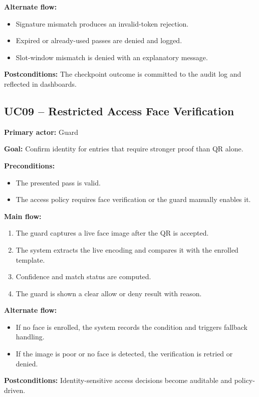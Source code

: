 \documentclass[12pt,letterpaper]{article}
\begin{document}
\textbf{Alternate flow:}
\begin{itemize}
    \item Signature mismatch produces an invalid-token rejection.
    \item Expired or already-used passes are denied and logged.
    \item Slot-window mismatch is denied with an explanatory message.
\end{itemize}

\textbf{Postconditions:} The checkpoint outcome is committed to the audit log and reflected in dashboards.

\subsection{UC09 -- Restricted Access Face Verification}
\textbf{Primary actor:} Guard

\textbf{Goal:} Confirm identity for entries that require stronger proof than QR alone.

\textbf{Preconditions:}
\begin{itemize}
    \item The presented pass is valid.
    \item The access policy requires face verification or the guard manually enables it.
\end{itemize}

\textbf{Main flow:}
\begin{enumerate}
    \item The guard captures a live face image after the QR is accepted.
    \item The system extracts the live encoding and compares it with the enrolled template.
    \item Confidence and match status are computed.
    \item The guard is shown a clear allow or deny result with reason.
\end{enumerate}

\textbf{Alternate flow:}
\begin{itemize}
    \item If no face is enrolled, the system records the condition and triggers fallback handling.
    \item If the image is poor or no face is detected, the verification is retried or denied.
\end{itemize}

\textbf{Postconditions:} Identity-sensitive access decisions become auditable and policy-driven.
\end{document}
